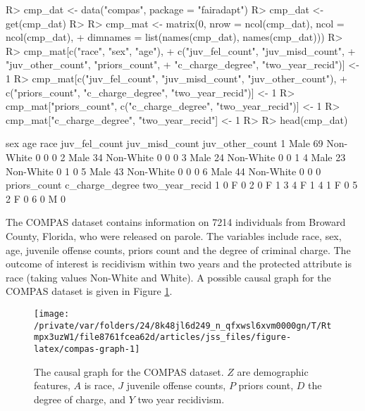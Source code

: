 \documentclass[
  nojss]{jss}
\begin{document}
\begin{CodeChunk}
\begin{CodeInput}
R> cmp_dat <- data("compas", package = "fairadapt")
R> cmp_dat <- get(cmp_dat)
R> 
R> cmp_mat <- matrix(0, nrow = ncol(cmp_dat), ncol = ncol(cmp_dat),
+                   dimnames = list(names(cmp_dat), names(cmp_dat)))
R> 
R> cmp_mat[c("race", "sex", "age"),
+         c("juv_fel_count", "juv_misd_count",
+           "juv_other_count", "priors_count",
+           "c_charge_degree", "two_year_recid")] <- 1
R> cmp_mat[c("juv_fel_count", "juv_misd_count", "juv_other_count"),
+         c("priors_count", "c_charge_degree", "two_year_recid")] <- 1
R> cmp_mat["priors_count", c("c_charge_degree", "two_year_recid")] <- 1
R> cmp_mat["c_charge_degree", "two_year_recid"] <- 1
R> 
R> head(cmp_dat)
\end{CodeInput}
\begin{CodeOutput}
   sex age      race juv_fel_count juv_misd_count juv_other_count
1 Male  69 Non-White             0              0               0
2 Male  34 Non-White             0              0               0
3 Male  24 Non-White             0              0               1
4 Male  23 Non-White             0              1               0
5 Male  43 Non-White             0              0               0
6 Male  44 Non-White             0              0               0
  priors_count c_charge_degree two_year_recid
1            0               F              0
2            0               F              1
3            4               F              1
4            1               F              0
5            2               F              0
6            0               M              0
\end{CodeOutput}
\end{CodeChunk}

The COMPAS dataset contains information on 7214 individuals from Broward
County, Florida, who were released on parole. The variables include
race, sex, age, juvenile offense counts, priors count and the degree of
criminal charge. The outcome of interest is recidivism within two years
and the protected attribute is race (taking values Non-White and White).
A possible causal graph for the COMPAS dataset is given in Figure
\ref{fig:compas-graph}.

\begin{CodeChunk}
\begin{figure}

{\centering \texttt{[image: /private/var/folders/24/8k48jl6d249\_n\_qfxwsl6xvm0000gn/T/Rtmpx3uzW1/file8761fcea62d/articles/jss\_files/figure-latex/compas-graph-1]} 

}

\caption[The causal graph for the COMPAS dataset]{The causal graph for the COMPAS dataset. $Z$ are demographic features, $A$ is race, $J$ juvenile offense counts, $P$ priors count, $D$ the degree of charge, and $Y$ two year recidivism.}\label{fig:compas-graph}
\end{figure}
\end{CodeChunk}
\end{document}
